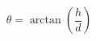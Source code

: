 \documentclass[border=1.5mm,preview]{standalone}
\begin{document}
\begin{equation*}
\theta = \arctan\left(\frac{h}{d}\right)
\end{equation*}
\end{document}
